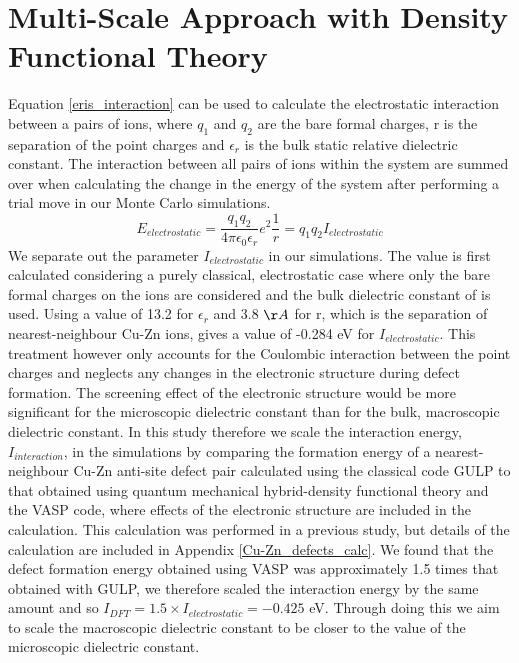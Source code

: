 \section{Multi-Scale Approach with Density Functional Theory}\label{MC_DFT}
Equation \ref{eris_interaction} can be used to calculate the electrostatic interaction between a pairs of ions, where $q_1$ and $q_2$ are the bare formal charges, r is the separation of the point charges and $\epsilon_r$ is the bulk static relative dielectric constant. The interaction between all pairs of ions within the system are summed over when calculating the change in the energy of the system after performing a trial move in our Monte Carlo simulations.
\begin{equation}\label{eris_interaction}
E_{electrostatic} = \frac{q_1q_2}{4\pi\epsilon_0\epsilon_r}e^2\frac{1}{r} = q_1q_2 I_{electrostatic}
\end{equation}
We separate out the parameter $I_{electrostatic}$ in our simulations. The value is first calculated considering a purely classical, electrostatic case where only the bare formal charges on the ions are considered and the bulk dielectric constant of { \CZTS } is used. Using a value of 13.2 for $\epsilon_r$ and 3.8 $\AA$ for r, which is the separation of nearest-neighbour Cu-Zn ions, gives a value of -0.284 eV for $I_{electrostatic}$.
This treatment however only accounts for the Coulombic interaction between the point charges and neglects any changes in the electronic structure during defect formation. The screening effect of the electronic structure would be more significant for the microscopic dielectric constant than for the bulk, macroscopic dielectric constant.
In this study therefore we scale the interaction energy, $I_{interaction}$, in the simulations by comparing the formation energy of a nearest-neighbour Cu-Zn anti-site defect pair calculated using the classical code GULP to that obtained using quantum mechanical hybrid-density functional theory and the VASP code, where effects of the electronic structure are included in the calculation. This calculation was performed in a previous study, but details of the calculation are included in Appendix \ref{Cu-Zn_defects_calc}. We found that the defect formation energy obtained using VASP was approximately 1.5 times that obtained with GULP, we therefore scaled the interaction energy by the same amount and so $I_{DFT} = 1.5 \times I_{electrostatic} = - 0.425$ eV. Through doing this we aim to scale the macroscopic dielectric constant to be closer to the value of the microscopic dielectric constant.

